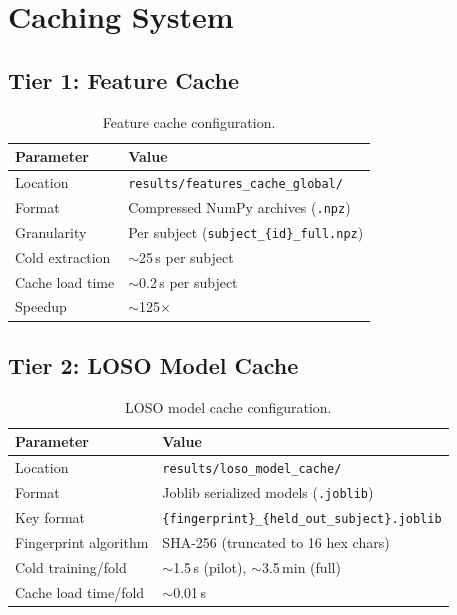 \section{Caching System}
\label{sec:app_caching}

\subsection{Tier 1: Feature Cache}

\begin{table}[h]
\centering
\caption{Feature cache configuration.}
\label{tab:feature_cache}
\begin{tabular}{l l}
\toprule
\textbf{Parameter} & \textbf{Value} \\
\midrule
Location           & \texttt{results/features\_cache\_global/} \\
Format             & Compressed NumPy archives (\texttt{.npz}) \\
Granularity        & Per subject (\texttt{subject\_\{id\}\_full.npz}) \\
Cold extraction    & $\sim$25\,s per subject \\
Cache load time    & $\sim$0.2\,s per subject \\
Speedup            & $\sim$125$\times$ \\
\bottomrule
\end{tabular}
\end{table}

\subsection{Tier 2: LOSO Model Cache}

\begin{table}[h]
\centering
\caption{LOSO model cache configuration.}
\label{tab:model_cache}
\begin{tabular}{l l}
\toprule
\textbf{Parameter} & \textbf{Value} \\
\midrule
Location               & \texttt{results/loso\_model\_cache/} \\
Format                 & Joblib serialized models (\texttt{.joblib}) \\
Key format             & \texttt{\{fingerprint\}\_\{held\_out\_subject\}.joblib} \\
Fingerprint algorithm  & SHA-256 (truncated to 16 hex chars) \\
Cold training/fold     & $\sim$1.5\,s (pilot), $\sim$3.5\,min (full) \\
Cache load time/fold   & $\sim$0.01\,s \\
\bottomrule
\end{tabular}
\end{table}

